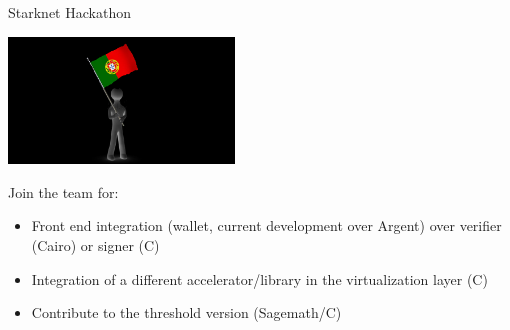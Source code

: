 \documentclass[aspectratio=43]{beamer}
\begin{document}

\begin{frame}{Starknet Hackathon}

\begin{center}
\includegraphics[width=6cm]{images/lisbon.png}
\end{center}

Join the team for:
\begin{itemize}
\item Front end integration (wallet, current development over Argent) over verifier (Cairo) or signer (C)
\item Integration of a different accelerator/library in the virtualization layer (C)
\item Contribute to the threshold version (Sagemath/C)
\end{itemize} 

\end{frame} 
\end{document}
